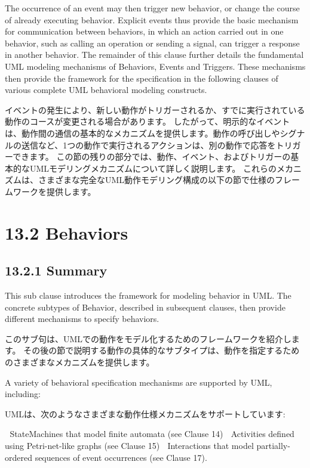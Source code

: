 \documentclass[a4paper,11pt]{ltjsarticle}
\begin{document}
The occurrence of an event may then trigger new behavior, or change the course of already executing behavior. 
Explicit events thus provide the basic mechanism for communication between behaviors, in which an action carried out in one behavior, such as calling an operation or sending a signal, can trigger a response in another behavior.
The remainder of this clause further details the fundamental UML modeling mechanisms of Behaviors, Events and Triggers. 
These mechanisms then provide the framework for the specification in the following clauses of various complete UML behavioral modeling constructs.


イベントの発生により、新しい動作がトリガーされるか、すでに実行されている動作のコースが変更される場合があります。
したがって、明示的なイベントは、動作間の通信の基本的なメカニズムを提供します。動作の呼び出しやシグナルの送信など、1つの動作で実行されるアクションは、別の動作で応答をトリガーできます。
この節の残りの部分では、動作、イベント、およびトリガーの基本的なUMLモデリングメカニズムについて詳しく説明します。
これらのメカニズムは、さまざまな完全なUML動作モデリング構成の以下の節で仕様のフレームワークを提供します。


\section*{13.2 Behaviors}

\subsection*{13.2.1 Summary}

This sub clause introduces the framework for modeling behavior in UML. The concrete subtypes of Behavior, described in subsequent clauses, then provide different mechanisms to specify behaviors.

このサブ句は、UMLでの動作をモデル化するためのフレームワークを紹介します。 その後の節で説明する動作の具体的なサブタイプは、動作を指定するためのさまざまなメカニズムを提供します。

A variety of behavioral specification mechanisms are supported by UML, including:

UMLは、次のようなさまざまな動作仕様メカニズムをサポートしています:

 StateMachines that model finite automata (see Clause 14)
 Activities defined using Petri-net-like graphs (see Clause 15)
 Interactions that model partially-ordered sequences of event occurrences (see Clause 17).
\end{document}
